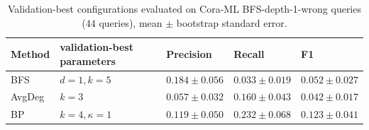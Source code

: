 \begin{table}[H]
  \centering
  \scriptsize
  \caption{Validation-best configurations evaluated on Cora-ML BFS-depth-1-wrong queries ($44$ queries), mean $\pm$ bootstrap standard error.}
  \label{tab:hard}
  \begin{tabular}{lllll}
    \toprule
    Method & validation-best parameters & Precision & Recall & F1 \\
    \midrule
    BFS & $d=1, k=5$ & $0.184\pm0.056$ & $0.033\pm0.019$ & $0.052\pm0.027$ \\
    AvgDeg & $k=3$ & $0.057\pm0.032$ & $0.160\pm0.043$ & $0.042\pm0.017$ \\
    BP & $k=4, \kappa=1$ & $0.119\pm0.050$ & $0.232\pm0.068$ & $0.123\pm0.041$ \\
    \bottomrule
  \end{tabular}
\end{table}
